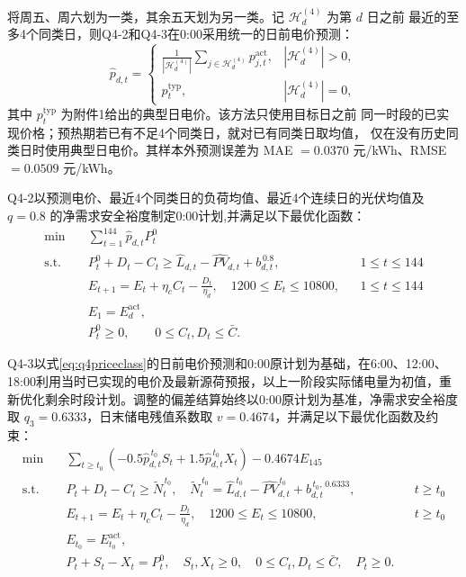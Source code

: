 \documentclass[withoutpreface,bwprint]{cumcmthesis}
\begin{document}
将周五、周六划为一类，其余五天划为另一类。记 $\mathcal H_d^{(4)}$ 为第 $d$ 日之前
最近的至多4个同类日，则Q4-2和Q4-3在0:00采用统一的日前电价预测：
\begin{equation}
\hat p_{d,t}=
\begin{cases}
\displaystyle\frac{1}{|\mathcal H_d^{(4)}|}
\sum_{j\in\mathcal H_d^{(4)}}p^{\mathrm{act}}_{j,t},
& |\mathcal H_d^{(4)}|>0,\\[8pt]
p^{\mathrm{typ}}_t,
& |\mathcal H_d^{(4)}|=0,
\end{cases}
\label{eq:q4priceclass}
\end{equation}
其中 $p^{\mathrm{typ}}_t$ 为附件1给出的典型日电价。该方法只使用目标日之前
同一时段的已实现价格；预热期若已有不足4个同类日，就对已有同类日取均值，
仅在没有历史同类日时使用典型日电价。其样本外预测误差为
MAE $=0.0370$ 元/kWh、RMSE $=0.0509$ 元/kWh。

Q4-2以预测电价、最近4个同类日的负荷均值、最近4个连续日的光伏均值及
$q=0.8$ 的净需求安全裕度制定0:00计划,并满足以下最优化函数：
\begin{align}
\min\quad & \sum_{t=1}^{144}\hat p_{d,t}P_t^0
\label{eq:q42_obj}\\
\text{s.t.}\quad
& P_t^0+D_t-C_t\geq
\hat L_{d,t}-\widehat{PV}_{d,t}+b_{d,t}^{\,0.8},
&& 1\leq t\leq144
\label{eq:q42_bal}\\
& E_{t+1}=E_t+\eta_cC_t-\frac{D_t}{\eta_d},
\quad 1200\leq E_t\leq10800,
&& 1\leq t\leq144
\label{eq:q42_soc}\\
& E_1=E_d^{\mathrm{act}},
\label{eq:q42_initial}\\
& P_t^0\geq0,\qquad 0\leq C_t,D_t\leq\bar C.
\label{eq:q42_bounds}
\end{align}

Q4-3以式\eqref{eq:q4priceclass}的日前电价预测和0:00原计划为基础，在6:00、12:00、18:00利用当时已实现的电价及最新源荷预报，以上一阶段实际储电量为初值，重新优化剩余时段计划。调整的偏差结算始终以0:00原计划为基准，净需求安全裕度取 \(q_3=0.6333\)，日末储电残值系数取 \(v=0.4674\)，并满足以下最优化函数及约束：
\begin{align}
\min\quad &
\sum_{t\geq t_0}
\left(-0.5\hat p_{d,t}^{\,t_0}S_t
+1.5\hat p_{d,t}^{\,t_0}X_t\right)
-0.4674E_{145}
\label{eq:q43_obj}\\
\text{s.t.}\quad
& P_t+D_t-C_t\geq\widetilde N_t^{\,t_0},
\quad
\widetilde N_t^{\,t_0}
=\hat L_{d,t}^{\,t_0}
-\widehat{PV}_{d,t}^{\,t_0}
+b_{d,t}^{\,t_0,\,0.6333},
&& t\geq t_0
\label{eq:q43_bal}\\
& E_{t+1}=E_t+\eta_cC_t-\frac{D_t}{\eta_d},
\quad 1200\leq E_t\leq10800,
&& t\geq t_0
\label{eq:q43_soc}\\
& E_{t_0}=E_{t_0}^{\mathrm{act}},
\label{eq:q43_initial}\\
& P_t+S_t-X_t=P_t^0,\quad S_t,X_t\geq0,
\quad 0\leq C_t,D_t\leq\bar C,\quad P_t\geq0.
\label{eq:q43_link}
\end{align}
\end{document}
